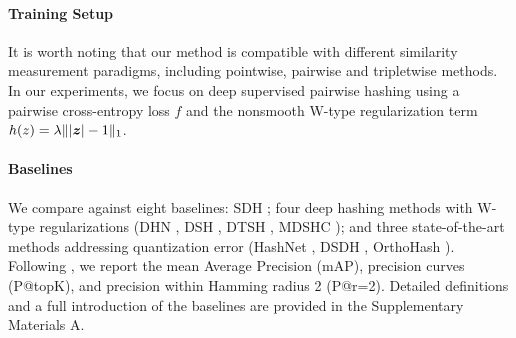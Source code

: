 \paragraph{Training Setup}  It is worth noting that our method is compatible with different similarity measurement paradigms, including pointwise, pairwise and tripletwise methods. In our experiments, we focus on deep supervised pairwise hashing using a pairwise cross-entropy loss \( f \) and the nonsmooth W-type regularization term \( h(z) = \lambda \| |\bm{z}| -1 \|_1 \). 

\paragraph{Baselines} We compare against eight baselines: SDH \cite{shenSupervisedDiscreteHashing2015}; four deep hashing methods with W-type regularizations (DHN \cite{zhuDeepHashingNetwork2016}, DSH \cite{liuDeepSupervisedHashing}, DTSH \cite{wang2016DTSH}, MDSHC \cite{wang2023deep}); 
and three state-of-the-art methods addressing quantization error (HashNet \cite{Cao2017HashNetDL}, DSDH \cite{li2017deep}, OrthoHash \cite{hoeOneLossAll2021}). Following \cite{liuDeepSupervisedHashing}, we report the mean Average Precision (mAP), precision curves (P@topK), and precision within Hamming radius 2 (P@r=2). Detailed definitions and a full introduction of the baselines are provided in the Supplementary Materials A.

